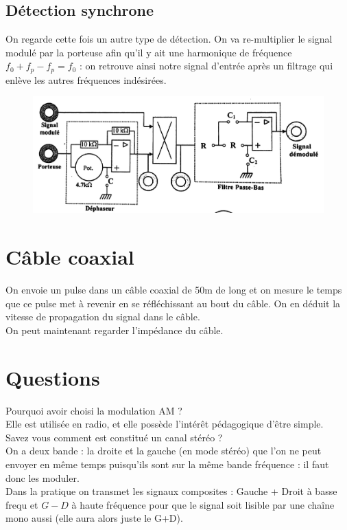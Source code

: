 \documentclass[12pt,prb,aps,epsf]{article}
\begin{document}
\subsection{Détection synchrone}
On regarde cette fois un autre type de détection. On va re-multiplier le signal modulé par la porteuse afin qu'il y ait une harmonique de fréquence $f_0+f_p -f_p = f_0$ : on retrouve ainsi notre signal d'entrée après un filtrage qui enlève les autres fréquences indésirées.
\begin{figure}[h]
	\centering \includegraphics[width=14cm]{detection}
\end{figure}

\section{Câble coaxial}
On envoie un pulse dans un câble coaxial de 50m de long et on mesure le temps que ce pulse met à revenir en se réfléchissant au bout du câble. On en déduit la vitesse de propagation du signal dans le câble.\\

On peut maintenant regarder l'impédance du câble. 

\section*{Questions}
Pourquoi avoir choisi la modulation AM ?\\
Elle est utilisée en radio, et elle possède l'intérêt pédagogique d'être simple.\\

Savez vous comment est constitué un canal stéréo ?\\
On a deux bande : la droite et la gauche (en mode stéréo) que l'on ne peut envoyer en même temps puisqu'ils sont sur la même bande fréquence : il faut donc les moduler.\\
Dans la pratique on transmet les signaux composites : Gauche + Droit à basse frequ et $G-D$ à haute fréquence pour que le signal soit lisible par une chaîne mono aussi (elle aura alors juste le G+D).\\
\end{document}
